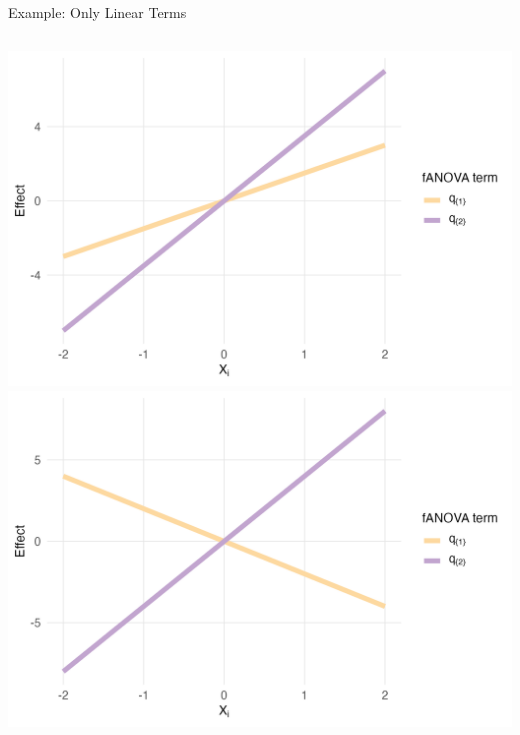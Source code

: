 \begin{frame}{Example: Only Linear Terms}
  \begin{columns}
      \includegraphics[width=\linewidth]{../images/experiment_section/linear_a1p15_a2p35_a11p00_a22p00_a12p00_rhop00_main.png}
      \includegraphics[width=\linewidth]{../images/experiment_section/linear_a1m20_a2p40_a11p00_a22p00_a12p00_rhop00_main.png}
  \end{columns}
\end{frame}

